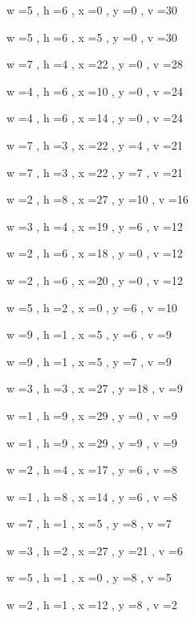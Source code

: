 \documentclass[11pt]{article}
\begin{document}


w =5 , h =6 , x =0 , y =0 , v =30
\par
w =5 , h =6 , x =5 , y =0 , v =30
\par
w =7 , h =4 , x =22 , y =0 , v =28
\par
w =4 , h =6 , x =10 , y =0 , v =24
\par
w =4 , h =6 , x =14 , y =0 , v =24
\par
w =7 , h =3 , x =22 , y =4 , v =21
\par
w =7 , h =3 , x =22 , y =7 , v =21
\par
w =2 , h =8 , x =27 , y =10 , v =16
\par
w =3 , h =4 , x =19 , y =6 , v =12
\par
w =2 , h =6 , x =18 , y =0 , v =12
\par
w =2 , h =6 , x =20 , y =0 , v =12
\par
w =5 , h =2 , x =0 , y =6 , v =10
\par
w =9 , h =1 , x =5 , y =6 , v =9
\par
w =9 , h =1 , x =5 , y =7 , v =9
\par
w =3 , h =3 , x =27 , y =18 , v =9
\par
w =1 , h =9 , x =29 , y =0 , v =9
\par
w =1 , h =9 , x =29 , y =9 , v =9
\par
w =2 , h =4 , x =17 , y =6 , v =8
\par
w =1 , h =8 , x =14 , y =6 , v =8
\par
w =7 , h =1 , x =5 , y =8 , v =7
\par
w =3 , h =2 , x =27 , y =21 , v =6
\par
w =5 , h =1 , x =0 , y =8 , v =5
\par
w =2 , h =1 , x =12 , y =8 , v =2
\par
\newpage
\end{document}
